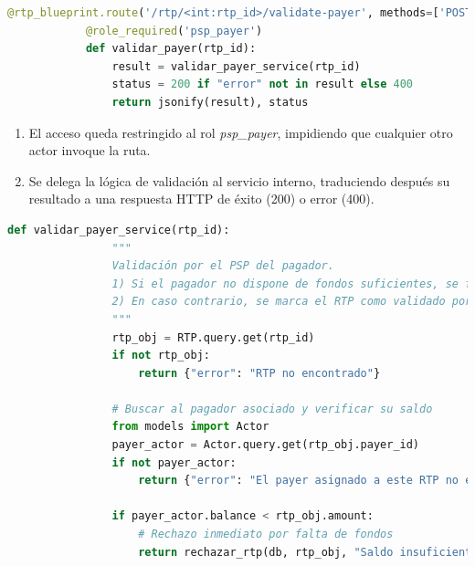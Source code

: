\begin{itemize}
       \begin{lstlisting}[language=Python, style=custom, caption={Endpoint validación pagador}]
            @rtp_blueprint.route('/rtp/<int:rtp_id>/validate-payer', methods=['POST'])
            @role_required('psp_payer')
            def validar_payer(rtp_id):
                result = validar_payer_service(rtp_id)
                status = 200 if "error" not in result else 400
                return jsonify(result), status
        \end{lstlisting}

        \begin{enumerate}
          \item El acceso queda restringido al rol \emph{psp\_payer}, impidiendo que
                cualquier otro actor invoque la ruta.
          \item Se delega la lógica de validación al servicio interno,
                traduciendo después su resultado a una respuesta HTTP de éxito
                (200) o error (400).
        \end{enumerate}
        \vspace{0.8em}

       \begin{lstlisting}[language=Python, style=custom, caption={Servicio de negocio validación pagador}]
            def validar_payer_service(rtp_id):
                """
                Validación por el PSP del pagador.
                1) Si el pagador no dispone de fondos suficientes, se fuerza el rechazo.
                2) En caso contrario, se marca el RTP como validado por el PSP del pagador.
                """
                rtp_obj = RTP.query.get(rtp_id)
                if not rtp_obj:
                    return {"error": "RTP no encontrado"}

                # Buscar al pagador asociado y verificar su saldo
                from models import Actor
                payer_actor = Actor.query.get(rtp_obj.payer_id)
                if not payer_actor:
                    return {"error": "El payer asignado a este RTP no existe"}

                if payer_actor.balance < rtp_obj.amount:
                    # Rechazo inmediato por falta de fondos
                    return rechazar_rtp(db, rtp_obj, "Saldo insuficiente (PSP forzó cancelación)")


\end{lstlisting}
\end{itemize}
